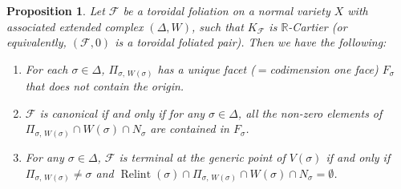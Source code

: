 \documentclass[12pt,reqno]{amsart}
\newtheorem{proposition}[theorem]{Proposition}
\theoremstyle{definition}
\newcommand{\on}{\operatorname}
\newcommand\cF{{\mathcal{F}}}
\newcommand\bR{{\mathbb R}}
\begin{document}
\begin{proposition}\label{can_term_toric}
    Let $\cF$ be a toroidal foliation on a normal variety $X$ with associated extended complex $(\Delta,W)$, such that $K_\cF$ is $\bR$-Cartier (or equivalently, $(\cF,0)$ is a toroidal foliated pair). 
    Then we have the following:
    \begin{enumerate}
        \item For each $\sigma\in\Delta$, $\Pi_{\sigma,\,W(\sigma)}$ has a unique facet ($=$codimension one face) $F_\sigma$ that does not contain the origin. 
        \item $\cF$ is canonical if and only if for any $\sigma\in\Delta$, all the non-zero elements of $\Pi_{\sigma,\,W(\sigma)}\cap W(\sigma)\cap N_\sigma$ are contained in $F_\sigma$.
        \item For any $\sigma\in\Delta$, $\cF$ is terminal at the generic point of $V(\sigma)$ if and only if $\Pi_{\sigma,\,W(\sigma)}\neq\sigma$ and $\on{Relint}(\sigma)\cap\Pi_{\sigma,\,W(\sigma)}\cap W(\sigma)\cap N_\sigma=\emptyset$. 
    \end{enumerate}
\end{proposition}
\end{document}

